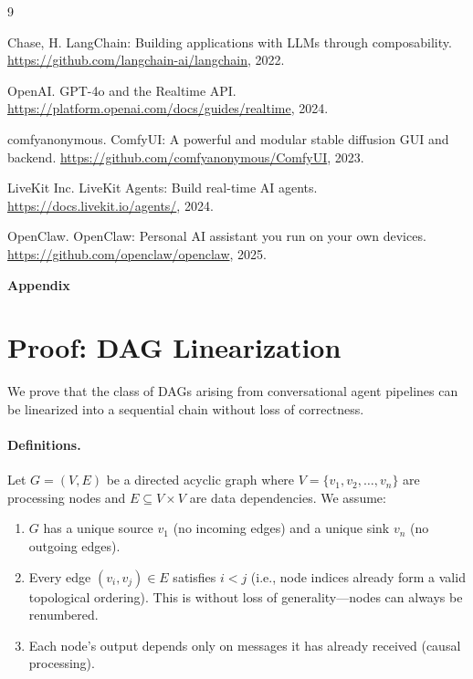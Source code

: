 \documentclass[11pt,a4paper]{article}
\begin{document}
\newpage

\begin{thebibliography}{9}

Chase, H.
\newblock LangChain: Building applications with LLMs through composability.
\newblock \url{https://github.com/langchain-ai/langchain}, 2022.

OpenAI.
\newblock GPT-4o and the Realtime API.
\newblock \url{https://platform.openai.com/docs/guides/realtime}, 2024.

comfyanonymous.
\newblock ComfyUI: A powerful and modular stable diffusion GUI and backend.
\newblock \url{https://github.com/comfyanonymous/ComfyUI}, 2023.

LiveKit Inc.
\newblock LiveKit Agents: Build real-time AI agents.
\newblock \url{https://docs.livekit.io/agents/}, 2024.

OpenClaw.
\newblock OpenClaw: Personal AI assistant you run on your own devices.
\newblock \url{https://github.com/openclaw/openclaw}, 2025.

\end{thebibliography}

\newpage
\appendix
\begin{center}
    {\LARGE\bfseries Appendix}
\end{center}
\vspace{1.5em}

\section{Proof: DAG Linearization}
\label{app:proof}

We prove that the class of DAGs arising from conversational agent pipelines can be linearized into a sequential chain without loss of correctness.

\paragraph{Definitions.}
Let $G = (V, E)$ be a directed acyclic graph where $V = \{v_1, v_2, \ldots, v_n\}$ are processing nodes and $E \subseteq V \times V$ are data dependencies. We assume:
\begin{enumerate}[nosep]
    \item[(A1)] $G$ has a unique source $v_1$ (no incoming edges) and a unique sink $v_n$ (no outgoing edges).
    \item[(A2)] Every edge $(v_i, v_j) \in E$ satisfies $i < j$ (i.e., node indices already form a valid topological ordering). This is without loss of generality---nodes can always be renumbered.
    \item[(A3)] Each node's output depends only on messages it has already received (causal processing).
\end{enumerate}
\end{document}
